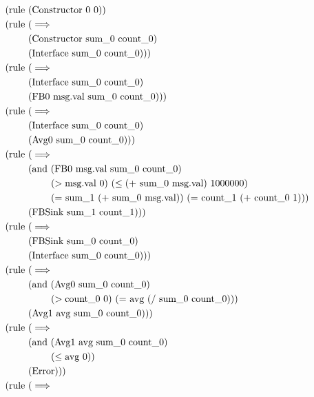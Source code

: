 \begin{figure}[p]
	\centering
	\begin{align*}
	(\text{rule } & (\text{Constructor 0 0}))
    \\
    (\text{rule } & (\implies \\
    & (\text{Constructor sum\_0 count\_0}) \\ 
    & (\text{Interface sum\_0 count\_0})))
    \\
    (\text{rule } & (\implies \\
    & (\text{Interface sum\_0 count\_0}) \\ 
    & (\text{FB0 msg.val sum\_0 count\_0})))
    \\
    (\text{rule } & (\implies \\
    & (\text{Interface sum\_0 count\_0}) \\ 
    & (\text{Avg0 sum\_0 count\_0})))
    \\
	(\text{rule } & (\implies \\
    & (\text{and } (\text{FB0 msg.val sum\_0 count\_0}) \\
    & \hspace{0.83cm} (>\text{msg.val 0}) \ (\leq\text{(+ sum\_0 msg.val) 1000000}) \\
    & \hspace{0.83cm} (\text{= sum\_1 (+ sum\_0 msg.val)}) \ (\text{= count\_1 (+ count\_0 1}))) \\ 
    & (\text{FBSink sum\_1 count\_1})))
    \\
    (\text{rule } & (\implies \\
    & (\text{FBSink sum\_0 count\_0}) \\ 
    & (\text{Interface sum\_0 count\_0})))
    \\
    (\text{rule } & (\implies \\
    & (\text{and } (\text{Avg0 sum\_0 count\_0}) \\
    & \hspace{0.83cm} (>\text{count\_0 0}) \ (\text{= avg (/ sum\_0 count\_0)})) \\ 
    & (\text{Avg1 avg sum\_0 count\_0})))
    \\
    (\text{rule } & (\implies \\
    & (\text{and } (\text{Avg1 avg sum\_0 count\_0}) \\
    & \hspace{0.83cm} (\leq\text{avg 0})) \\ 
    & (\text{Error})))
    \\
    (\text{rule } & (\implies \\

\end{align*}
\end{figure}
